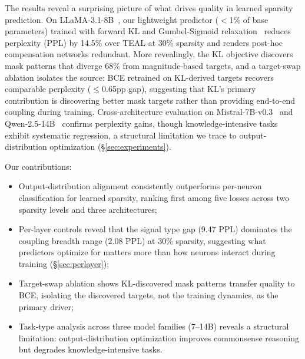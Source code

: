 The results reveal a surprising picture of what drives quality in learned sparsity prediction.
On LLaMA-3.1-8B~\cite{grattafiori2024llama3}, our lightweight predictor ($<$1\% of base parameters) trained with forward KL and Gumbel-Sigmoid relaxation~\cite{jang2017gumbel} reduces perplexity (PPL) by 14.5\% over TEAL at 30\% sparsity and renders post-hoc compensation networks redundant.
More revealingly, the KL objective discovers mask patterns that diverge 68\% from magnitude-based targets, and a target-swap ablation isolates the source: BCE retrained on KL-derived targets recovers comparable perplexity ($\leq$0.65pp gap), suggesting that KL's primary contribution is discovering better mask targets rather than providing end-to-end coupling during training.
Cross-architecture evaluation on Mistral-7B-v0.3~\cite{jiang2023mistral} and Qwen-2.5-14B~\cite{qwen2024qwen25} confirms perplexity gains, though knowledge-intensive tasks exhibit systematic regression, a structural limitation we trace to output-distribution optimization (\S\ref{sec:experiments}).

Our contributions:
\begin{itemize}[nosep,leftmargin=*]
\item Output-distribution alignment consistently outperforms per-neuron classification for learned sparsity, ranking first among five losses across two sparsity levels and three architectures;
\item Per-layer controls reveal that the signal type gap (9.47 PPL) dominates the coupling breadth range (2.08 PPL) at 30\% sparsity, suggesting what predictors optimize for matters more than how neurons interact during training (\S\ref{sec:perlayer});
\item Target-swap ablation shows KL-discovered mask patterns transfer quality to BCE, isolating the discovered targets, not the training dynamics, as the primary driver;
\item Task-type analysis across three model families (7--14B) reveals a structural limitation: output-distribution optimization improves commonsense reasoning but degrades knowledge-intensive tasks.
\end{itemize}
